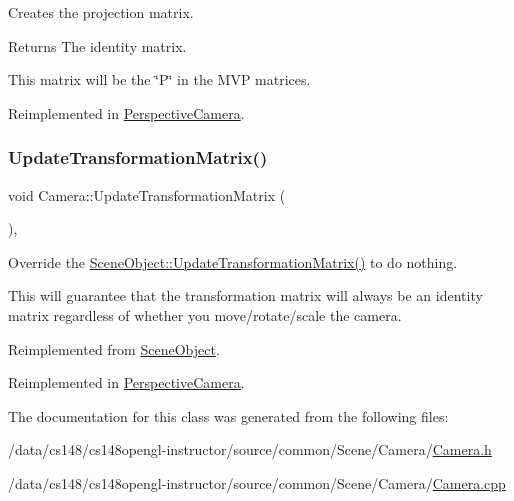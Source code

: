 Creates the projection matrix. 

\begin{DoxyReturn}{Returns}
The identity matrix.
\end{DoxyReturn}
This matrix will be the \char`\"{}\+P\char`\"{} in the M\+VP matrices. 

Reimplemented in \hyperlink{class_perspective_camera_ab467388c7d3e4c2ef9b498c16f291545}{Perspective\+Camera}.

\hypertarget{class_camera_aea640c892a3807671d8ca49616d96eda}{}\label{class_camera_aea640c892a3807671d8ca49616d96eda} 
\subsubsection{\texorpdfstring{Update\+Transformation\+Matrix()}{UpdateTransformationMatrix()}}
{\footnotesize\ttfamily void Camera\+::\+Update\+Transformation\+Matrix (\begin{DoxyParamCaption}{ }\end{DoxyParamCaption})\hspace{0.3cm}{\ttfamily [protected]}, {\ttfamily [virtual]}}



Override the \hyperlink{class_scene_object_a20e31da3f9d2765de50cdb2d637ae6c9}{Scene\+Object\+::\+Update\+Transformation\+Matrix()} to do nothing. 

This will guarantee that the transformation matrix will always be an identity matrix regardless of whether you move/rotate/scale the camera. 

Reimplemented from \hyperlink{class_scene_object_a20e31da3f9d2765de50cdb2d637ae6c9}{Scene\+Object}.



Reimplemented in \hyperlink{class_perspective_camera_a2f17fb07425e2146d5692805753fa368}{Perspective\+Camera}.



The documentation for this class was generated from the following files\+:\begin{DoxyCompactItemize}
\item 
/data/cs148/cs148opengl-\/instructor/source/common/\+Scene/\+Camera/\hyperlink{_camera_8h}{Camera.\+h}\item 
/data/cs148/cs148opengl-\/instructor/source/common/\+Scene/\+Camera/\hyperlink{_camera_8cpp}{Camera.\+cpp}\end{DoxyCompactItemize}
